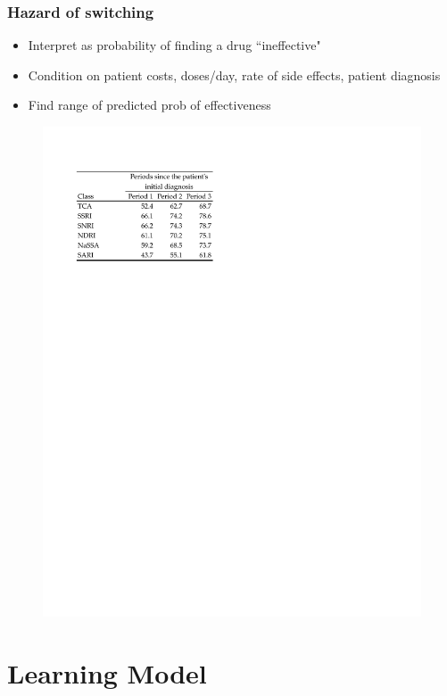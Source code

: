 \documentclass[xcolor=pdftex,dvipsnames,table,mathserif,aspectratio=169]{beamer}
\begin{document}
\begin{frame}
\frametitle{Hazard of switching}

\begin{itemize}
\item Interpret as probability of finding a drug ``ineffective"

\item Condition on patient costs, doses/day, rate of side effects, patient
diagnosis

\item Find range of predicted prob of effectiveness
\end{itemize}

\begin{figure}[h!]
\centering\includegraphics[width=.5\linewidth]{./resources/prob_effective.pdf}
\end{figure}
\end{frame}

\section{Learning Model}

\end{document}
